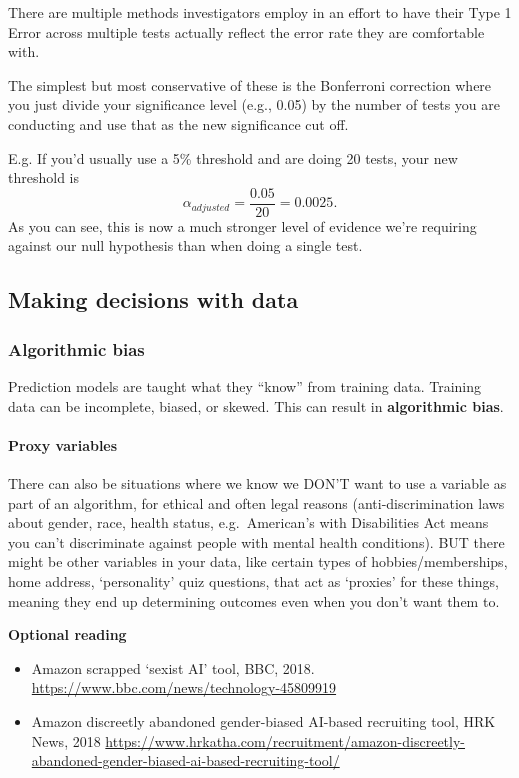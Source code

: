 \documentclass[
  openany]{book}
\providecommand{\tightlist}{%
  \setlength{\itemsep}{0pt}\setlength{\parskip}{0pt}}
\begin{document}
There are multiple methods investigators employ in an effort to have their Type 1 Error across multiple tests actually reflect the error rate they are comfortable with.

The simplest but most conservative of these is the Bonferroni correction where you just divide your significance level (e.g., 0.05) by the number of tests you are conducting and use that as the new significance cut off.

E.g. If you'd usually use a 5\% threshold and are doing 20 tests, your new threshold is \[\alpha_{adjusted} = \frac{0.05}{20} = 0.0025.\]
As you can see, this is now a much stronger level of evidence we're requiring against our null hypothesis than when doing a single test.

\hypertarget{making-decisions-with-data}{%
\subsection{Making decisions with data}\label{making-decisions-with-data}}

\hypertarget{algorithmic-bias}{%
\subsubsection{Algorithmic bias}\label{algorithmic-bias}}

Prediction models are taught what they ``know'' from training data. Training data can be incomplete, biased, or skewed. This can result in
\textbf{algorithmic bias}.

\hypertarget{proxy-variables}{%
\paragraph{Proxy variables}\label{proxy-variables}}

There can also be situations where we know we DON'T want to use a variable as part of an algorithm, for ethical and often legal reasons (anti-discrimination laws about gender, race, health status, e.g.~American's with Disabilities Act means you can't discriminate against people with mental health conditions). BUT there might be other variables in your data, like certain types of hobbies/memberships, home address, `personality' quiz questions, that act as `proxies' for these things, meaning they end up determining outcomes even when you don't want them to.

\textbf{Optional reading}

\begin{itemize}
\tightlist
\item
  Amazon scrapped `sexist AI' tool, BBC, 2018. \url{https://www.bbc.com/news/technology-45809919}\\
\item
  Amazon discreetly abandoned gender-biased AI-based recruiting tool, HRK News, 2018 \url{https://www.hrkatha.com/recruitment/amazon-discreetly-abandoned-gender-biased-ai-based-recruiting-tool/}
\end{itemize}
\end{document}
